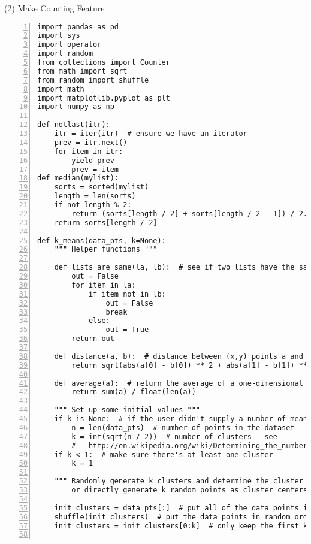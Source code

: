 (2) Make Counting Feature
\begin{lstlisting}[numbers=left, breaklines=true]
import pandas as pd
import sys
import operator
import random
from collections import Counter
from math import sqrt
from random import shuffle
import math
import matplotlib.pyplot as plt
import numpy as np

def notlast(itr):
    itr = iter(itr)  # ensure we have an iterator
    prev = itr.next()
    for item in itr:
        yield prev
        prev = item
def median(mylist):
    sorts = sorted(mylist)
    length = len(sorts)
    if not length % 2:
        return (sorts[length / 2] + sorts[length / 2 - 1]) / 2.0
    return sorts[length / 2]

def k_means(data_pts, k=None):
    """ Helper functions """

    def lists_are_same(la, lb):  # see if two lists have the same elements
        out = False
        for item in la:
            if item not in lb:
                out = False
                break
            else:
                out = True
        return out

    def distance(a, b):  # distance between (x,y) points a and b
        return sqrt(abs(a[0] - b[0]) ** 2 + abs(a[1] - b[1]) ** 2)

    def average(a):  # return the average of a one-dimensional list (e.g., [1, 2, 3])
        return sum(a) / float(len(a))

    """ Set up some initial values """
    if k is None:  # if the user didn't supply a number of means to look for, try to estimate how many there are
        n = len(data_pts)  # number of points in the dataset
        k = int(sqrt(n / 2))  # number of clusters - see
        #   http://en.wikipedia.org/wiki/Determining_the_number_of_clusters_in_a_data_set#Rule_of_thumb
    if k < 1:  # make sure there's at least one cluster
        k = 1

    """ Randomly generate k clusters and determine the cluster centers,
        or directly generate k random points as cluster centers. """

    init_clusters = data_pts[:]  # put all of the data points into clusters
    shuffle(init_clusters)  # put the data points in random order
    init_clusters = init_clusters[0:k]  # only keep the first k random clusters


\end{lstlisting}
